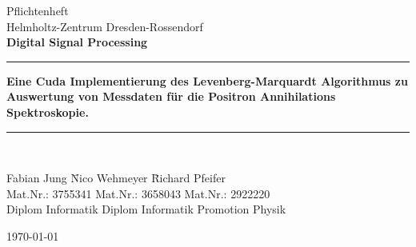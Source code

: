 \documentclass[paper=a4, headings=small]{scrartcl}
\begin{document}
\begin{titlepage}
\begin{center}
	\large{Pflichtenheft\\ Helmholtz-Zentrum Dresden-Rossendorf } \\[10mm]
	\textbf{\LARGE{Digital Signal Processing}}\\[5mm]
	\rule{\linewidth}{0.5mm}
	\textbf{\Large{ Eine Cuda Implementierung des Levenberg-Marquardt Algorithmus zu Auswertung von Messdaten für die Positron Annihilations Spektroskopie.}}
	\rule{\linewidth}{0.5mm}\\[3cm]

\parbox{0cm}{
\begin{tabbing}
  Fabian Jung	              \hspace{2cm}	\= Nico Wehmeyer  \hspace{2cm}	\= Richard Pfeifer\\
  Mat.Nr.:  3755341                         \> Mat.Nr.: 3658043			    \> Mat.Nr.: 2922220\\
  Diplom Informatik 			            \> Diplom Informatik     	    \> Promotion Physik\\
\end{tabbing}
}

\vfill
{\large \today}
\end{center}

\end{titlepage}

\tableofcontents
\newpage

\newpage

\newpage

\end{document}
